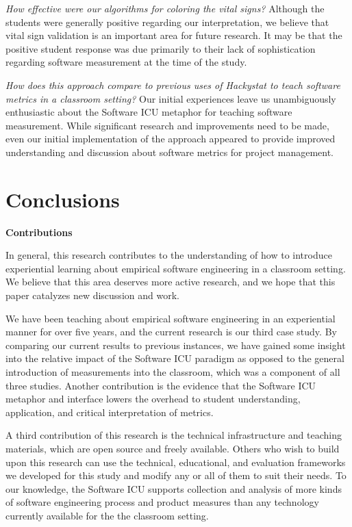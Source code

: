 \documentclass{acm_proc_article-sp}
\begin{document}
{\em How effective were our algorithms for coloring the vital signs?}
Although the students were generally positive regarding our interpretation,
we believe that vital sign validation is an important area for future
research.  It may be that the positive student response was due primarily
to their lack of sophistication regarding software measurement at the time
of the study.

{\em How does this approach compare to previous uses of Hackystat to teach
software metrics in a classroom setting?}  Our initial experiences leave us
unambiguously enthusiastic about the Software ICU metaphor for teaching
software measurement. While significant research and improvements need to
be made, even our initial implementation of the approach appeared to
provide improved understanding and discussion about software metrics for
project management.

\section{Conclusions}
\label{sec:conclusions}

{\bf Contributions}

In general, this research contributes to the understanding of how to
introduce experiential learning about empirical software engineering in a
classroom setting.  We believe that this area deserves more active
research, and we hope that this paper catalyzes new discussion and work.

We have been teaching about empirical software engineering in an
experiential manner for over five years, and the current research is our
third case study.  By comparing our current results to previous instances,
we have gained some insight into the relative impact of the Software ICU
paradigm as opposed to the general introduction of measurements into the
classroom, which was a component of all three studies.  Another
contribution is the evidence that the Software ICU metaphor and interface
lowers the overhead to student understanding, application, and critical
interpretation of metrics.

A third contribution of this research is the technical infrastructure and
teaching materials, which are open source and freely available.  Others who
wish to build upon this research can use the technical, educational, and
evaluation frameworks we developed for this study and modify any or all of
them to suit their needs.  To our knowledge, the Software ICU supports
collection and analysis of more kinds of software engineering process and
product measures than any technology currently available for the the
classroom setting.
\end{document}
